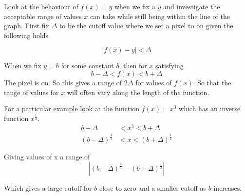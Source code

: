 \documentclass[preview]{standalone}
\begin{document}
Look at the behaviour of $f(x) = y$ when we fix a $y$ and
investigate the acceptable range of values $x$ can take while
still being within the line of the graph.
First fix $\Delta$ to be the cutoff value where we set a pixel to on
given the following holds

\[
  |f(x) - y| < \Delta
\]

When we fix $y = b$ for some constant $b$, then for
$x$ satisfying
\[
  b - \Delta < f(x) < b + \Delta
\]
The pixel is on. So this gives a range of $2\Delta$ for values of
$f(x)$. So that the range of values for $x$ will often vary along the
length of the function.

For a particular example look at the function $f(x)=x^3$ which has an
inverse function $x^{\frac{1}{3}}$.
\begin{align*}
  b - \Delta &< x^3 < b + \Delta \\
 (b - \Delta)^{\frac{1}{3}} &< x < (b + \Delta)^{\frac{1}{3}}
\end{align*}

Giving values of x a range of
\[
  |(b - \Delta)^{\frac{1}{3}} - (b + \Delta)^{\frac{1}{3}}|
\]

Which gives a large cutoff for $b$ close to zero and a smaller cutoff as $b$
increases. 
\end{document}
